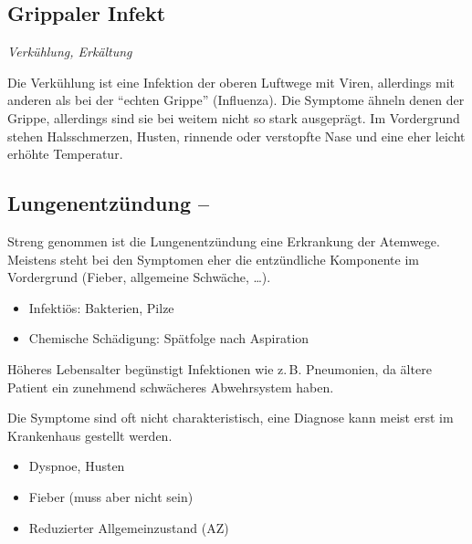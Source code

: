 \subsection{Grippaler Infekt}

\emph{ Verkühlung,
 Erkältung} 

{
Die Verkühlung ist eine Infektion der oberen Luftwege mit Viren,
allerdings mit anderen als bei der "`echten
Grippe"' (Influenza). Die Symptome ähneln denen der
Grippe, allerdings sind sie bei weitem nicht so stark ausgeprägt. Im
Vordergrund stehen Halsschmerzen, Husten, rinnende oder verstopfte Nase
und eine eher leicht erhöhte Temperatur. 
}{}{}{}{}



\subsection{Lungenentzündung -- }
\label{topic:pneumonie}

Streng genommen ist die Lungenentzündung eine Erkrankung der
Atemwege. Meistens steht bei den Symptomen eher die
entzündliche Komponente im Vordergrund (Fieber, allgemeine
Schwäche, \ldots).

{
\begin{itemize}
  \item Infektiös: Bakterien, Pilze
  \item Chemische Schädigung: Spätfolge nach
  Aspiration
\end{itemize}

Höheres Lebensalter begünstigt Infektionen wie z.\,B.
Pneumonien, da ältere Patient ein zunehmend schwächeres
Abwehrsystem haben.
}{}{}{}{}


{
Die Symptome sind oft nicht charakteristisch, eine Diagnose kann meist
erst im Krankenhaus gestellt werden. 

\begin{itemize}
  \item Dyspnoe, Husten
  \item Fieber (muss aber nicht sein)
  \item Reduzierter Allgemeinzustand (AZ)
\end{itemize}
}{

}{}{}{}





